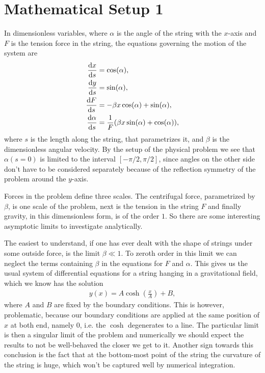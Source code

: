 \documentclass[10pt,a4paper,twocolumn]{article}
\begin{document}
\section{Mathematical Setup 1}

In dimensionless variables, where $\alpha$ is the angle of the string with the $x$-axis and $F$ is the tension force in the string, the equations governing the motion of the system are
%
\begin{align}
    \frac{\dif x}{\dif s} &= \cos(\alpha), \notag\\
    \frac{\dif y}{\dif s} &= \sin(\alpha), \notag\\
    \frac{\dif F}{\dif s} &= -\beta x \cos(\alpha) + \sin(\alpha), \notag\\
    \frac{\dif \alpha}{\dif s} &= \frac{1}{F} (\beta x \sin(\alpha) + \cos(\alpha)),
\end{align}
%
where $s$ is the length along the string, that parametrizes it, and $\beta$ is the dimensionless angular velocity. By the setup of the physical problem we see that $\alpha(s = 0)$ is limited to the interval $[-\pi/2, \pi/2]$, since angles on the other side don't have to be considered separately because of the reflection symmetry of the problem around the $y$-axis.

Forces in the problem define three scales. The centrifugal force, parametrized by $\beta$, is one scale of the problem, next is the tension in the string $F$ and finally gravity, in this dimensionless form, is of the order $1$. So there are some interesting asymptotic limits to investigate analytically. 

The easiest to understand, if one has ever dealt with the shape of strings under some outside force, is the limit $\beta \ll 1$. To zeroth order in this limit we can neglect the terms containing $\beta$ in the equations for $F$ and $\alpha$. This gives us the usual system of differential equations for a string hanging in a gravitational field, which we know has the solution
%
\begin{align}
    y(x) = A \cosh \left( \frac{x}{A} \right) + B,
\end{align}
%
where $A$ and $B$ are fixed by the boundary conditions. This is however, problematic, because our boundary conditions are applied at the same position of $x$ at both end, namely $0$, i.e. the $\cosh$ degenerates to a line. The particular limit is then a singular limit of the problem and numerically we should expect the results to not be well-behaved the closer we get to it. Another sign towards this conclusion is the fact that at the bottom-most point of the string the curvature of the string is huge, which won't be captured well by numerical integration.
\end{document}
